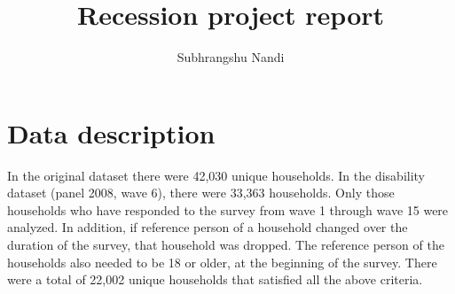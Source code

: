 \documentclass[11pt]{extarticle} %
\begin{document}

\title{Recession project report}
\author{Subhrangshu Nandi \\
\date{}
}

\maketitle

\section{Data description}
In the original dataset there were 42,030 unique households. In the disability dataset (panel 2008, wave 6), there were 33,363 households. Only those households who have responded to the survey from wave 1 through wave 15 were analyzed. In addition, if reference person of a household changed over the duration of the survey, that household was dropped. The reference person of the households also needed to be 18 or older, at the beginning of the survey. There were a total of 22,002 unique households that satisfied all the above criteria. 
\end{document}
